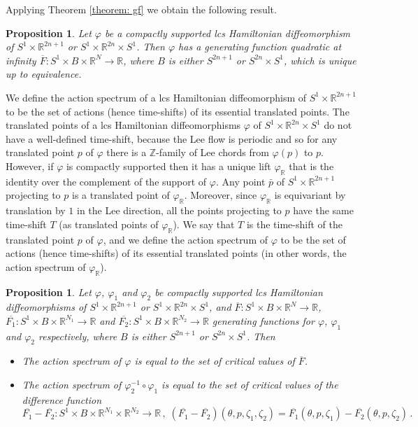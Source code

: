 \documentclass{amsart}
\newtheorem{prop}[thm]{Proposition}
\theoremstyle{remark}
\begin{document}
Applying Theorem \ref{theorem: gf}
we obtain the following result.

\begin{prop}\label{proposition: gf lcs diffeomorphisms}
Let $\varphi$ be a compactly supported lcs Hamiltonian diffeomorphism
of $S^1 \times \mathbb{R}^{2n+1}$ or $S^1 \times \mathbb{R}^{2n} \times S^1$.
Then $\varphi$ has a generating function quadratic at infinity
$\overline{F}: S^1 \times B \times \mathbb{R}^N \rightarrow \mathbb{R}$,
where $B$ is either $S^{2n+1}$ or $S^{2n} \times S^1$,
which is unique up to equivalence.
\end{prop}

We define the action spectrum
of a lcs Hamiltonian diffeomorphism of $S^1 \times \mathbb{R}^{2n+1}$
to be the set of actions (hence time-shifts)
of its essential translated points.
The translated points of a lcs Hamiltonian diffeomorphisms
$\varphi$ of $S^1 \times \mathbb{R}^{2n} \times S^1$
do not have a well-defined time-shift,
because the Lee flow is periodic
and so for any translated point $p$ of $\varphi$
there is a $\mathbb{Z}$-family
of Lee chords from $\varphi (p)$ to $p$.
However,
if $\varphi$ is compactly supported
then it has a unique lift $\varphi_{\mathbb{R}}$
that is the identity over the complement of the support of $\varphi$.
Any point $\bar{p}$ of $S^1 \times \mathbb{R}^{2n+1}$
projecting to $p$
is a translated point of $\varphi_{\mathbb{R}}$.
Moreover,
since $\varphi_{\mathbb{R}}$ is equivariant by translation by $1$
in the Lee direction,
all the points projecting to $p$
have the same time-shift $T$
(as translated points of $\varphi_{\mathbb{R}}$).
We say that $T$ is the time-shift
of the translated point $p$ of $\varphi$,
and we define the action spectrum of $\varphi$
to be the set of actions (hence time-shifts)
of its essential translated points
(in other words,
the action spectrum of $\varphi_{\mathbb{R}}$).

\begin{prop}\label{proposition: action spectrum}
Let $\varphi$, $\varphi_1$ and $\varphi_2$
be compactly supported lcs Hamiltonian diffeomorphisms
of $S^1 \times \mathbb{R}^{2n+1}$ or $S^1 \times \mathbb{R}^{2n} \times S^1$,
and $\overline{F}: S^1 \times B \times \mathbb{R}^N \rightarrow \mathbb{R}$,
$\overline{F_1}: S^1 \times B \times \mathbb{R}^{N_1} \rightarrow \mathbb{R}$
and $\overline{F_2}: S^1 \times B \times \mathbb{R}^{N_2} \rightarrow \mathbb{R}$
generating functions for $\varphi$, $\varphi_1$ and $\varphi_2$ respectively,
where $B$ is either $S^{2n+1}$ or $S^{2n} \times S^1$.
Then
\begin{itemize}
\item[(i)] The action spectrum of $\varphi$
is equal to the set of critical values of $\overline{F}$.
\item[(ii)] The action spectrum of $\varphi_2^{-1} \circ \varphi_1$
is equal to the set of critical values of the difference function
\[
\overline{F_1} - \overline{F_2}:
S^1 \times B \times \mathbb{R}^{N_1} \times \mathbb{R}^{N_2}
\rightarrow \mathbb{R} \,,\;
(\overline{F_1} - \overline{F_2})
(\theta, p, \zeta_1, \zeta_2)
= \overline{F_1} (\theta, p, \zeta_1) - \overline{F_2} (\theta, p, \zeta_2) \,.
\]
\end{itemize}
\end{prop}
\end{document}
